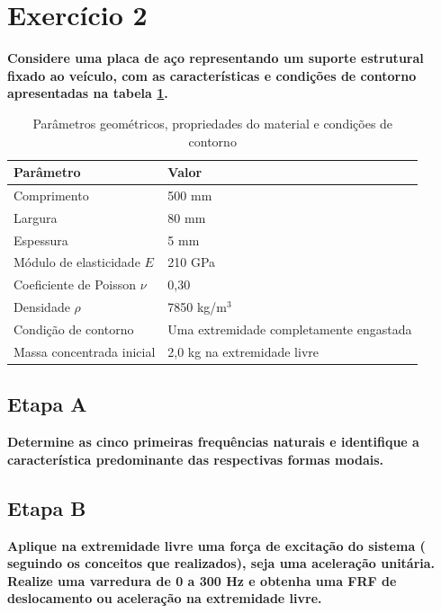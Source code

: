 \documentclass[a4paper, 12pt]{article}
\begin{document}
\section{Exercício 2}

\textbf{Considere uma placa de aço representando um suporte estrutural fixado ao veículo, com as características e condições de contorno apresentadas na tabela \ref{tab:parametros}.}

\begin{table}[H]
    \centering
    \caption{Parâmetros geométricos, propriedades do material e condições de contorno}
    \label{tab:parametros}
    \begin{tabular}{l l}
        \hline
        \textbf{Parâmetro} & \textbf{Valor} \\ \hline \hline
        Comprimento & 500 mm \\ 
        Largura & 80 mm \\ 
        Espessura & 5 mm \\ 
        Módulo de elasticidade $E$ & 210 GPa \\ 
        Coeficiente de Poisson $\nu$ & 0,30 \\ 
        Densidade $\rho$ & 7850 kg/m$^3$ \\ 
        Condição de contorno & Uma extremidade completamente engastada \\ 
        Massa concentrada inicial & 2,0 kg na extremidade livre \\ \hline
    \end{tabular}
\end{table}



\subsection{Etapa A}

\textbf{Determine as cinco primeiras frequências naturais e identifique a característica predominante das 
respectivas formas modais.}

\subsection{Etapa B}

\textbf{Aplique na extremidade livre uma força de excitação do sistema ( seguindo os conceitos que realizados), 
seja uma aceleração unitária. Realize uma varredura de 0 a 300 Hz e obtenha uma FRF de deslocamento 
ou aceleração na extremidade livre.} 
\end{document}
